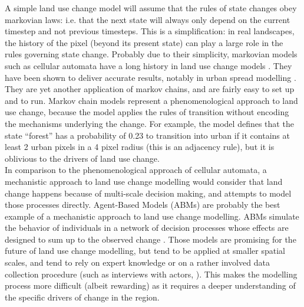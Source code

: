 \documentclass[12pt,Bold,TexShade]{mcgilletdclass}
\begin{document}
{%
A simple land use change model will assume that the rules of state changes obey markovian laws: i.e. that the next state will always only depend on the current timestep and not previous timesteps. This is a simplification: in real landscapes, the history of the pixel (beyond its present state) can play a large role in the rules governing state change. Probably due to their simplicity, markovian models such as cellular automata have a long history in land use change models \citep{agarwal_review_2002}. They have been shown to deliver accurate results, notably in urban spread modelling \citep{soares-filho_dinamicastochastic_2002, jokar_arsanjani_integration_2013, iacono_markov_2015}. They are yet another application of markov chains, and are fairly easy to set up and to run. Markov chain models represent a phenomenological approach to land use change, because the model applies the rules of transition without encoding the mechanisms underlying the  change. For example, the model defines that the state “forest” has a probability of 0.23 to transition into urban if it contains at least 2 urban pixels in a 4 pixel radius (this is an adjacency rule), but it is oblivious to the drivers of land use change. \\

In comparison to the phenomenological approach of cellular automata, a mechanistic approach to land use change modelling would consider that land change happens because of multi-scale decision making, and attempts to model those processes directly. Agent-Based Models (ABMs) are probably the best example of a mechanistic approach to land use change modelling. ABMs simulate the behavior of individuals in a network of decision processes whose effects are designed to sum up to the observed change \citep{parker_agent-based_2002, filatova_spatial_2013}. Those models are promising for the future of land use change modelling, but tend to be applied at smaller spatial scales, and tend to rely on expert knowledge or on a rather involved data collection procedure (such as interviews with actors, \cite{taylor_agent-based_2016}). This makes the modelling process more difficult (albeit rewarding) as it requires a deeper understanding of the specific drivers of change in the region. \\

}
\end{document}
